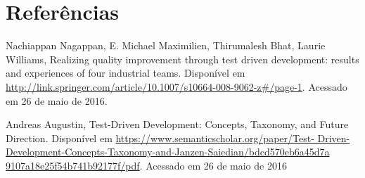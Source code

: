 \documentclass{article}
\begin{document}
  \section{Referências}

  Nachiappan Nagappan, E. Michael Maximilien, Thirumalesh Bhat,
  Laurie Williams, Realizing quality improvement through test driven 
  development: results and experiences of four industrial teams. Disponível em
  \url{http://link.springer.com/article/10.1007/s10664-008-9062-z#/page-1}.
  Acessado em 26 de maio de 2016.

  Andreas Augustin, Test-Driven Development: Concepts, Taxonomy, and Future 
  Direction. Disponível em \url{https://www.semanticscholar.org/paper/Test-
  Driven-Development-Concepts-Taxonomy-and-Janzen-Saiedian/bdcd570eb6a45d7a
  9107a18e25f54b741b92177f/pdf}. Acessado em 26 de maio de 2016
\end{document}

